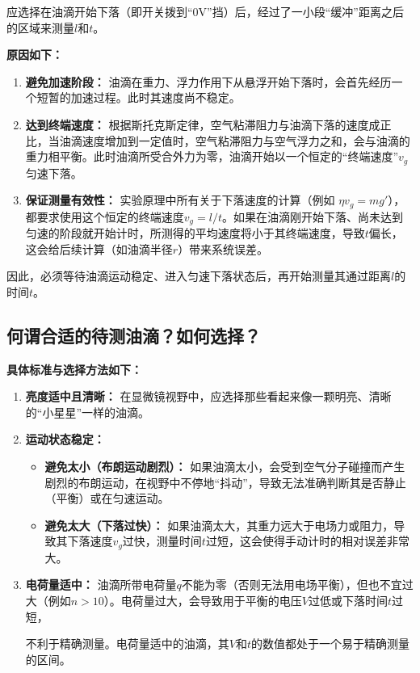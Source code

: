 \documentclass[yuxi]{../../templates/Report}%
\begin{document}
\begin{fullreportonly}
应选择在油滴开始下落（即开关拨到“0V”挡）后，经过了一小段“缓冲”距离之后的区域来测量$l$和$t$。

\textbf{原因如下：}
\begin{enumerate}
    \item \textbf{避免加速阶段：} 油滴在重力、浮力作用下从悬浮开始下落时，会首先经历一个短暂的加速过程。此时其速度尚不稳定。
    \item \textbf{达到终端速度：} 根据斯托克斯定律，空气粘滞阻力与油滴下落的速度成正比，当油滴速度增加到一定值时，空气粘滞阻力与空气浮力之和，会与油滴的重力相平衡。此时油滴所受合外力为零，油滴开始以一个恒定的“终端速度”$v_g$匀速下落。
    \item \textbf{保证测量有效性：} 实验原理中所有关于下落速度的计算（例如 $\eta v_g = mg' $），都要求使用这个恒定的终端速度$v_g = l/t$。如果在油滴刚开始下落、尚未达到匀速的阶段就开始计时，所测得的平均速度将小于其终端速度，导致$t$偏长，这会给后续计算（如油滴半径$r$）带来系统误差。
\end{enumerate}

因此，必须等待油滴运动稳定、进入匀速下落状态后，再开始测量其通过距离$l$的时间$t$。


\subsection{何谓合适的待测油滴？如何选择？}

\textbf{具体标准与选择方法如下：}
\begin{enumerate}
    \item \textbf{亮度适中且清晰：} 在显微镜视野中，应选择那些看起来像一颗明亮、清晰的“小星星”一样的油滴。
    \item \textbf{运动状态稳定：}
        \begin{itemize}
            \item \textbf{避免太小（布朗运动剧烈）：} 如果油滴太小，会受到空气分子碰撞而产生剧烈的布朗运动，在视野中不停地“抖动”，导致无法准确判断其是否静止（平衡）或在匀速运动。
            \item \textbf{避免太大（下落过快）：} 如果油滴太大，其重力远大于电场力或阻力，导致其下落速度$v_g$过快，测量时间$t$过短，这会使得手动计时的相对误差非常大。
        \end{itemize}
    \item \textbf{电荷量适中：} 油滴所带电荷量$q$不能为零（否则无法用电场平衡），但也不宜过大（例如$n>10$）。电荷量过大，会导致用于平衡的电压$V$过低或下落时间$t$过短，

    不利于精确测量。电荷量适中的油滴，其$V$和$t$的数值都处于一个易于精确测量的区间。


\end{enumerate}
\end{fullreportonly}
\end{document}
